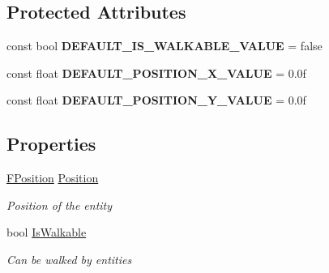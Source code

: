 \subsection*{Protected Attributes}
\begin{DoxyCompactItemize}
\item 
\hypertarget{class_hel_project_1_1_game_world_1_1_h_object_aa48be7d1041c9417c831a904bd52377f}{}const bool {\bfseries D\+E\+F\+A\+U\+L\+T\+\_\+\+I\+S\+\_\+\+W\+A\+L\+K\+A\+B\+L\+E\+\_\+\+V\+A\+L\+U\+E} = false\label{class_hel_project_1_1_game_world_1_1_h_object_aa48be7d1041c9417c831a904bd52377f}

\item 
\hypertarget{class_hel_project_1_1_game_world_1_1_h_object_a32e043831c6f30e1a73ee033f9d00483}{}const float {\bfseries D\+E\+F\+A\+U\+L\+T\+\_\+\+P\+O\+S\+I\+T\+I\+O\+N\+\_\+\+X\+\_\+\+V\+A\+L\+U\+E} = 0.\+0f\label{class_hel_project_1_1_game_world_1_1_h_object_a32e043831c6f30e1a73ee033f9d00483}

\item 
\hypertarget{class_hel_project_1_1_game_world_1_1_h_object_a5b601f5ab506ca13d2f27ec8d0bd0540}{}const float {\bfseries D\+E\+F\+A\+U\+L\+T\+\_\+\+P\+O\+S\+I\+T\+I\+O\+N\+\_\+\+Y\+\_\+\+V\+A\+L\+U\+E} = 0.\+0f\label{class_hel_project_1_1_game_world_1_1_h_object_a5b601f5ab506ca13d2f27ec8d0bd0540}

\end{DoxyCompactItemize}
\subsection*{Properties}
\begin{DoxyCompactItemize}
\item 
\hyperlink{class_hel_project_1_1_tools_1_1_f_position}{F\+Position} \hyperlink{class_hel_project_1_1_game_world_1_1_h_object_ac7f41f5a7036bbc845fea1b27bb9d110}{Position}
\begin{DoxyCompactList}\small\item\em Position of the entity \end{DoxyCompactList}\item 
bool \hyperlink{class_hel_project_1_1_game_world_1_1_h_object_a97444e657db0148fb442570fbd7fe98f}{Is\+Walkable}
\begin{DoxyCompactList}\small\item\em Can be walked by entities \end{DoxyCompactList}\end{DoxyCompactItemize}


